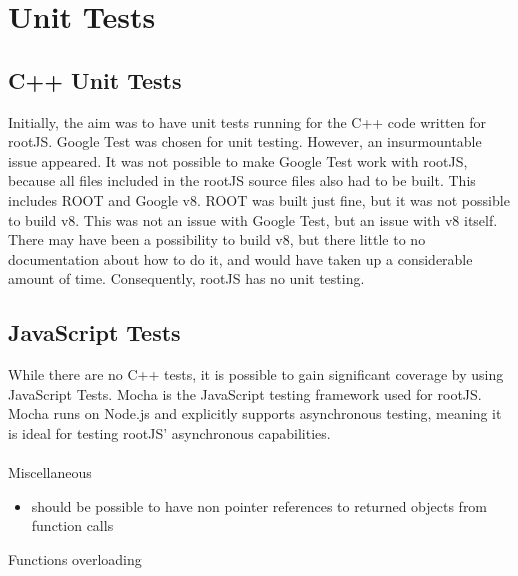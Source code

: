 \chapter{Unit Tests}
\section{C++ Unit Tests}
Initially, the aim was to have unit tests running for the C++ code written for rootJS. 
Google Test was chosen for unit testing. However, an insurmountable issue appeared.
It was not possible to make Google Test work with rootJS, because all files included in
the rootJS source files also had to be built. This includes ROOT and Google v8. ROOT was built just fine, 
but it was not possible to build v8. This was not an issue with Google Test, but an issue with 
v8 itself. There may have been a possibility to build v8, but there little to no documentation 
about how to do it, and would have taken up a considerable amount of time. 
Consequently, rootJS has no unit testing.

\section{JavaScript Tests}
While there are no C++ tests, it is possible to gain significant coverage by using
JavaScript Tests. Mocha is the JavaScript testing framework used for rootJS. 
Mocha runs on Node.js and explicitly supports asynchronous testing, meaning it is ideal for testing 
rootJS' asynchronous capabilities.
\\ \\
Miscellaneous
\begin{itemize}
\item should be possible to have non pointer references to returned objects from function calls
\end{itemize}
Functions overloading


